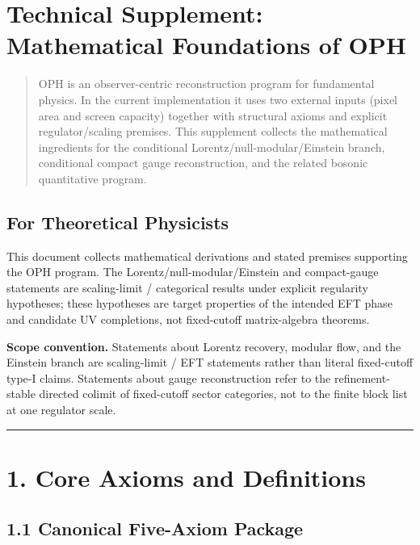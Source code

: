 \section{Technical Supplement: Mathematical Foundations of OPH}\label{technical-supplement-mathematical-foundations-of-observer-patch-holography}

\begin{quote}
OPH is an observer-centric reconstruction program for fundamental physics. In the current implementation it uses two external inputs (pixel area and screen capacity) together with structural axioms and explicit regulator/scaling premises. This supplement collects the mathematical ingredients for the conditional Lorentz/null-modular/Einstein branch, conditional compact gauge reconstruction, and the related bosonic quantitative program.
\end{quote}

\subsection{For Theoretical Physicists}\label{for-theoretical-physicists}

This document collects mathematical derivations and stated premises supporting the OPH program. The Lorentz/null-modular/Einstein and compact-gauge statements are scaling-limit / categorical results under explicit regularity hypotheses; these hypotheses are target properties of the intended EFT phase and candidate UV completions, not fixed-cutoff matrix-algebra theorems.

\textbf{Scope convention.} Statements about Lorentz recovery, modular flow, and the Einstein branch are scaling-limit / EFT statements rather than literal fixed-cutoff type-I claims. Statements about gauge reconstruction refer to the refinement-stable directed colimit of fixed-cutoff sector categories, not to the finite block list at one regulator scale.

\begin{center}\rule{0.5\linewidth}{0.5pt}\end{center}

\section{1. Core Axioms and Definitions}\label{1-core-axioms-and-definitions}

\subsection{1.1 Canonical Five-Axiom Package}\label{11-the-axiom-set}

